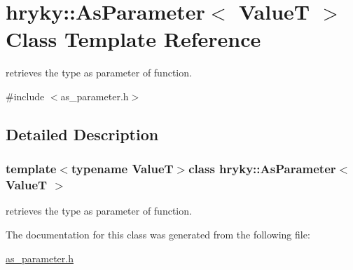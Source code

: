 \hypertarget{classhryky_1_1_as_parameter}{\section{hryky\-:\-:As\-Parameter$<$ Value\-T $>$ Class Template Reference}
\label{classhryky_1_1_as_parameter}
}


retrieves the type as parameter of function.  




{\ttfamily \#include $<$as\-\_\-parameter.\-h$>$}



\subsection{Detailed Description}
\subsubsection*{template$<$typename Value\-T$>$class hryky\-::\-As\-Parameter$<$ Value\-T $>$}

retrieves the type as parameter of function. 

The documentation for this class was generated from the following file\-:\begin{DoxyCompactItemize}
\item 
\hyperlink{as__parameter_8h}{as\-\_\-parameter.\-h}\end{DoxyCompactItemize}
